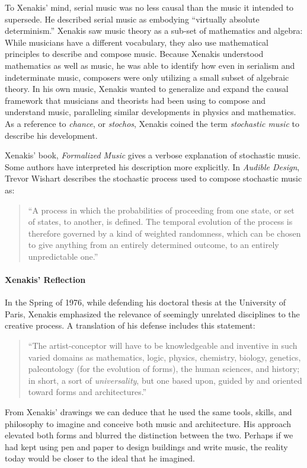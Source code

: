 To Xenakis' mind, serial music was no less causal than the music it
intended to supersede. He described serial music as embodying
``virtually absolute determinism.''\cite{xenakis1992formalized}
Xenakis saw music theory as a sub-set of mathematics and algebra:
While musicians have a different vocabulary, they also use
mathematical principles to describe and compose music. Because Xenakis
understood mathematics as well as music, he was able to identify how
even in serialism and indeterminate music, composers were only
utilizing a small subset of algebraic theory. In his own music,
Xenakis wanted to generalize and expand the causal framework that
musicians and theorists had been using to compose and understand
music, paralleling similar developments in physics and
mathematics. As a reference to \emph{chance}, or \emph{stochos},
Xenakis coined the term \emph{stochastic music} to describe his
development.

Xenakis' book, \textit{Formalized Music} gives a verbose explanation
of stochastic music. Some authors have interpreted his description
more explicitly. In \textit{Audible Design}, Trevor Wishart describes
the stochastic process used to compose stochastic music as:
\begin{quotation}
  ``A process in which the probabilities of proceeding from one state,
  or set of states, to another, is defined. The temporal evolution of
  the process is therefore governed by a kind of weighted randomness,
  which can be chosen to give anything from an entirely determined
  outcome, to an entirely unpredictable one.''\cite{Wishart1994}
\end{quotation}

\paragraph{Xenakis' Reflection} In the Spring of 1976, while defending
his doctoral thesis at the University of Paris, Xenakis emphasized the
relevance of seemingly unrelated disciplines to the creative process. A
translation of his defense includes this statement:
\begin{quotation}
  ``The artist-conceptor will have to be knowledgeable and inventive
  in such varied domains as mathematics, logic, physics, chemistry,
  biology, genetics, paleontology (for the evolution of forms), the
  human sciences, and history; in short, a sort of
  \emph{universality}, but one based upon, guided by and oriented
  toward forms and architectures.''\cite{russolo1986art}
\end{quotation}
From Xenakis' drawings we can deduce that he used the same tools,
skills, and philosophy to imagine and conceive both music and
architecture. His approach elevated both forms and blurred the distinction
between the two. Perhaps if we had kept using pen and paper to design
buildings and write music, the reality today would be closer to the
ideal that he imagined. 

